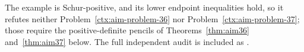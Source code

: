 \begin{cxrefutation}
\begin{remark}[Scope]
The example is Schur-positive, and its lower endpoint inequalities hold, so it refutes neither Problem~\ref{ctx:aim-problem-36} nor Problem~\ref{ctx:aim-problem-37}; those require the positive-definite pencils of Theorems~\ref{thm:aim36} and~\ref{thm:aim37} below.  The full independent audit is included as .
\end{remark}
\end{cxrefutation}



